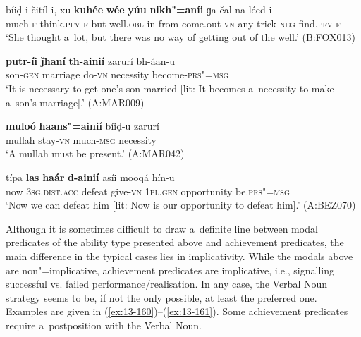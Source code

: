 \begin{exe}
\ex
\label{ex:13-156}
\gll bíiḍ-i čitíl-i, xu \textbf{kuhée} \textbf{wée} \textbf{yúu} \textbf{  nikh"=aníi} ɡa čal na léed-i  \\
much-\textsc{f} think.\textsc{pfv-f} but well.\textsc{obl} in from  come.out-\textsc{vn} any trick \textsc{neg} find.\textsc{pfv-f}  \\
\glt `She thought a~lot, but there was no way of getting out of the well.' (B:FOX013)

\ex
\label{ex:13-157}
\gll \textbf{putr-íi} \textbf{ǰhaní} \textbf{th-ainií} zarurí bh-áan-u \\
son-\textsc{gen} marriage do-\textsc{vn} necessity become-\textsc{prs"=msg}  \\
\glt `It is necessary to get one's son married [lit: It becomes a~necessity to make a~son's marriage].' (A:MAR009)

\ex
\label{ex:13-158}
\gll \textbf{muloó} \textbf{haans"=ainií} bíiḍ-u zarurí \\
mullah stay-\textsc{vn}  much-\textsc{msg} necessity  \\
\glt `A mullah must be present.' (A:MAR042)

\ex
\label{ex:13-159}
\gll típa \textbf{las} \textbf{haár} \textbf{d-ainií} asíi mooqá  hín-u \\
now \textsc{3sg.dist.acc} defeat give-\textsc{vn} \textsc{1pl.gen} opportunity be.\textsc{prs"=msg}  \\
\glt `Now we can defeat him [lit: Now is our opportunity to defeat him].' (A:BEZ070) 
\end{exe}

 Although it is sometimes difficult to draw a~definite line between modal predicates of the ability type presented above and achievement predicates, the main difference in the typical cases lies in implicativity. While the modals above are non"=implicative, achievement predicates are implicative, i.e., signalling successful vs. failed performance/realisation. In any case, the Verbal Noun strategy seems to be, if not the only possible, at least the preferred one. Examples are given in (\ref{ex:13-160})--(\ref{ex:13-161}). Some achievement predicates require a~postposition with the Verbal Noun.

